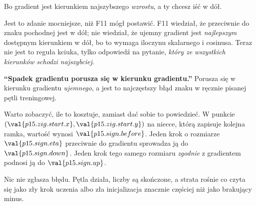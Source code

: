 \begin{fr}
\begin{ansblock}
Bo gradient jest kierunkiem najszybszego \emph{wzrostu}, a ty chcesz iść w
dół.
\end{ansblock}

Jest to zdanie mocniejsze, niż F11 mógł postawić. F11 wiedział, że przeciwnie
do znaku pochodnej jest w dół; nie wiedział, że ujemny gradient jest
\emph{najlepszym} dostępnym kierunkiem w dół, bo to wymaga iloczynu skalarnego
i cosinusa. Teraz nie jest to reguła kciuka, tylko odpowiedź na pytanie,
\emph{który ze wszystkich kierunków schodzi najszybciej}.

\begin{trapbox}
\textbf{\enquote{Spadek gradientu porusza się w kierunku gradientu.}} Porusza
się w kierunku gradientu \emph{ujemnego}, a jest to najczęstszy błąd znaku w
ręcznie pisanej pętli treningowej.

Warto zobaczyć, ile to kosztuje, zamiast dać sobie to powiedzieć. W punkcie
$(\val{p15.zig.start.x}, \val{p15.zig.start.y})$ na niecce, którą zapisuje
kolejna ramka, wartość wynosi $\val{p15.sign.before}$. Jeden krok o rozmiarze
$\val{p15.sign.eta}$ przeciwnie do gradientu sprowadza ją do
$\val{p15.sign.down}$. Jeden krok tego samego rozmiaru \emph{zgodnie} z
gradientem podnosi ją do $\val{p15.sign.up}$.

Nic nie zgłasza błędu. Pętla działa, liczby są skończone, a strata rośnie
\dash{} co czyta się jako zły krok uczenia albo zła inicjalizacja znacznie
częściej niż jako brakujący minus.
\end{trapbox}
\end{fr}


